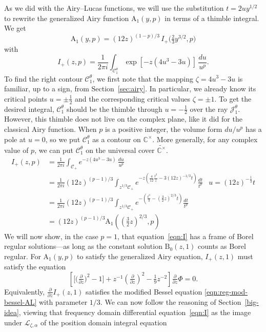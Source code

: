 \documentclass{article}
\newcommand{\C}{\mathbb{C}}
\newcommand{\laplace}{\mathcal{L}}
\theoremstyle{definition}
\theoremstyle{plain}
\newenvironment{verify}{\color{ForestGreen}}{\color{black}}
\begin{document}
As we did with the Airy--Lucas functions, we will use the substitution $t = 2uy^{1/2}$ to rewrite the generalized Airy function $\mathrm{A}_1(y,p)$ in terms of a thimble integral. We get
\[ \mathrm{A}_1(y,p) = (12 z)^{(1-p)/3}\,I_+\big(\tfrac{2}{3}y^{3/2},p\big) \]
with
\[ I_+(z,p) = \frac{1}{2\pi i} \int_{\mathcal{C}^\theta_1} \exp\left[-z\left(4u^3 - 3u\right)\right]\,\frac{du}{u^p}. \]
To find the right contour $\mathcal{C}_1^\theta$, we first note that the mapping $\zeta = 4u^3 - 3u$ is familiar, up to a sign, from Section~\ref{sec:airy}. In particular, we already know its critical points $u = \pm\tfrac{1}{2}$ and the corresponding critical values $\zeta = \pm 1$. To get the desired integral, $\mathcal{C}_1^\theta$ should be the thimble through $u = -\tfrac{1}{2}$ over the ray $\mathcal{J}^\theta_1$. However, this thimble does not live on the complex plane, like it did for the classical Airy function. When $p$ is a positive integer, the volume form $du/u^p$ has a pole at $u = 0$, so we put $\mathcal{C}_1^\theta$ as a contour on $\C^\times$. More generally, for any complex value of $p$, we can put $\mathcal{C}_1^\theta$ on the universal cover $\widetilde{\C^\times}$.
\begin{verify}
\begin{align*}
I_{+}(z,p)&=\frac{1}{2\pi i}\int_{\mathcal{C}_{+}}e^{-z(4u^3-3u)}\, \frac{du}{u^p} &\\
&=\frac{1}{2\pi i}(12 z)^{(p-1)/3}\int_{z^{1/3}\mathcal{C}_{+}}e^{-z(\tfrac{4}{12}\tfrac{t^3}{z}-3 (12 z)^{-1/3}t)}\frac{dt}{t^p} & u=(12 z)^{-\tfrac{1}{3}}t\\
&=\frac{1}{2\pi i}(12 z)^{(p-1)/3}\int_{z^{1/3}\mathcal{C}_{+}}e^{-\left(\frac{t^3}{3}-(\tfrac{3}{2} z)^{2/3}t\right)}\frac{dt}{t^p} & \\
&=(12 z)^{(p-1)/3}\mathrm{A}_1((\tfrac{3}{2}z)^{2/3},p)
\end{align*}  
\end{verify}
%
We will now show, in the case $p = 1$, that equation~\eqref{eqn:I} has a frame of Borel regular solutions---as long as the constant solution $\mathrm{B}_0(z, 1)$ counts as Borel regular. For $\mathrm{A}_1(y, p)$ to satisfy the generalized Airy equation, $I_+(z,1)$ must satisfy the equation
\begin{equation}\label{eqn:I}
\left[\big[\big(\tfrac{\partial}{\partial z}\big)^2 - 1\big] + z^{-1} \left(\tfrac{\partial}{\partial z}\right)^2 - \tfrac{1}{9} z^{-2} \right] \tfrac{\partial}{\partial z} \Phi = 0.
\end{equation}
Equivalently, $\tfrac{\partial}{\partial z} I_+(z, 1)$ satisfies the modified Bessel equation \eqref{eqn:reg-mod-bessel-AL} with parameter $1/3$. We can now follow the reasoning of Section~\ref{big-idea}, viewing that frequency domain differential equation~\eqref{eqn:I} as the image under $\laplace_{\zeta, \alpha}$ of the position domain integral equation
\end{document}
